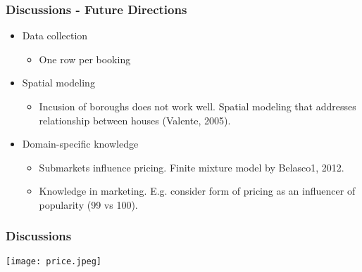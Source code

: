 \documentclass{beamer}
\begin{document}


\begin{frame}
    \frametitle{Discussions - Future Directions}

    \begin{itemize}
        \item Data collection
        \begin{itemize}
            \item One row per booking
        \end{itemize}
        \item Spatial modeling
        \begin{itemize}
            \item Incusion of boroughs does not work well. Spatial modeling that addresses relationship between houses (Valente, 2005).
        \end{itemize}
        \item Domain-specific knowledge
        \begin{itemize}
            \item Submarkets influence pricing. Finite mixture model by Belasco1, 2012.
            \item Knowledge in marketing. E.g. consider form of pricing as an influencer of popularity (99 vs 100).
        \end{itemize}
    \end{itemize}

\end{frame}


\begin{frame}
    \frametitle{Discussions}

    \centering
    \texttt{[image: price.jpeg]}
\end{frame}
\end{document}

